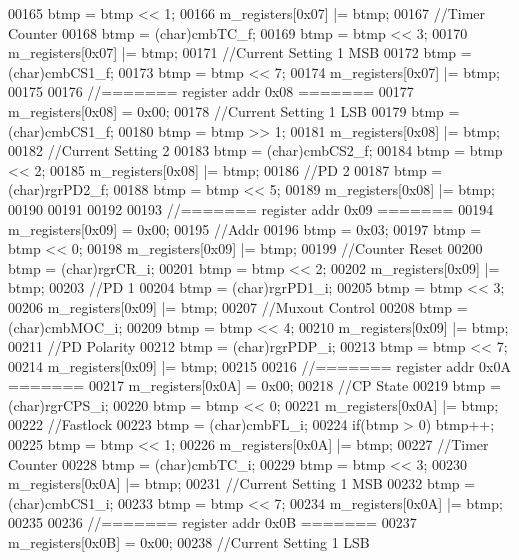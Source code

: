\begin{DoxyCode}
00165     btmp = btmp << 1;
00166     m_registers[0x07] |= btmp;
00167     \textcolor{comment}{//Timer Counter}
00168     btmp = (char)cmbTC_f;
00169     btmp = btmp << 3;
00170     m_registers[0x07] |= btmp;
00171     \textcolor{comment}{//Current Setting 1 MSB}
00172     btmp = (char)cmbCS1_f;
00173     btmp = btmp << 7;
00174     m_registers[0x07] |= btmp;
00175 
00176     \textcolor{comment}{//======= register addr 0x08 =======}
00177     m_registers[0x08] = 0x00;
00178     \textcolor{comment}{//Current Setting 1 LSB}
00179     btmp = (char)cmbCS1_f;
00180     btmp = btmp >> 1;
00181     m_registers[0x08] |= btmp;
00182     \textcolor{comment}{//Current Setting 2}
00183     btmp = (char)cmbCS2_f;
00184     btmp = btmp << 2;
00185     m_registers[0x08] |= btmp;
00186     \textcolor{comment}{//PD 2}
00187     btmp = (char)rgrPD2_f;
00188     btmp = btmp << 5;
00189     m_registers[0x08] |= btmp;
00190 
00191 
00192 
00193     \textcolor{comment}{//======= register addr 0x09 =======}
00194     m_registers[0x09] = 0x00;
00195     \textcolor{comment}{//Addr}
00196     btmp = 0x03;
00197     btmp = btmp << 0;
00198     m_registers[0x09] |= btmp;
00199     \textcolor{comment}{//Counter Reset}
00200     btmp = (char)rgrCR_i;
00201     btmp = btmp << 2;
00202     m_registers[0x09] |= btmp;
00203     \textcolor{comment}{//PD 1}
00204     btmp = (char)rgrPD1_i;
00205     btmp = btmp << 3;
00206     m_registers[0x09] |= btmp;
00207     \textcolor{comment}{//Muxout Control}
00208     btmp = (char)cmbMOC_i;
00209     btmp = btmp << 4;
00210     m_registers[0x09] |= btmp;
00211     \textcolor{comment}{//PD Polarity}
00212     btmp = (char)rgrPDP_i;
00213     btmp = btmp << 7;
00214     m_registers[0x09] |= btmp;
00215 
00216     \textcolor{comment}{//======= register addr 0x0A =======}
00217     m_registers[0x0A] = 0x00;
00218     \textcolor{comment}{//CP State}
00219     btmp = (char)rgrCPS_i;
00220     btmp = btmp << 0;
00221     m_registers[0x0A] |= btmp;
00222     \textcolor{comment}{//Fastlock}
00223     btmp = (char)cmbFL_i;
00224     \textcolor{keywordflow}{if}(btmp > 0) btmp++;
00225     btmp = btmp << 1;
00226     m_registers[0x0A] |= btmp;
00227     \textcolor{comment}{//Timer Counter}
00228     btmp = (char)cmbTC_i;
00229     btmp = btmp << 3;
00230     m_registers[0x0A] |= btmp;
00231     \textcolor{comment}{//Current Setting 1 MSB}
00232     btmp = (char)cmbCS1_i;
00233     btmp = btmp << 7;
00234     m_registers[0x0A] |= btmp;
00235 
00236     \textcolor{comment}{//======= register addr 0x0B =======}
00237     m_registers[0x0B] = 0x00;
00238     \textcolor{comment}{//Current Setting 1 LSB}

\end{DoxyCode}
